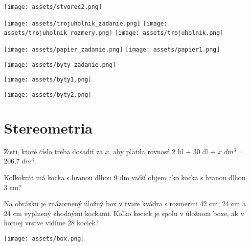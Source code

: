  \begin{example}
 	\begin{center}
 		\texttt{[image: assets/stvorec2.png]}
 	\end{center}
 \end{example}
 
 \begin{example}
 	\begin{center}
 		\texttt{[image: assets/trojuholnik\_zadanie.png]}
 		\texttt{[image: assets/trojuholnik\_rozmery.png]}
 		\texttt{[image: assets/trojuholnik.png]}
 	\end{center}
 \end{example}

\begin{example}
	\begin{center}
		\texttt{[image: assets/papier\_zadanie.png]}
		\texttt{[image: assets/papier1.png]}
	\end{center}
\end{example}

\begin{center}
	\texttt{[image: assets/byty\_zadanie.png]}
\end{center}

\begin{example}
	\begin{center}
		\texttt{[image: assets/byty1.png]}
	\end{center}
\end{example}

\begin{example}
	\begin{center}
		\texttt{[image: assets/byty2.png]}
	\end{center}
\end{example}
 

\section{Stereometria}

\begin{example}
	Zisti, ktoré číslo treba dosadiť za $x$, aby platila rovnosť 2 hl + 30 dl + $x$ $dm^3$ = 206,7 $dm^3$.
\end{example}

\begin{example}
	Koľkokrát má kocka s hranou dlhou 9 dm väčší objem ako kocka s hranou dlhou 3 cm?	
\end{example}

\begin{example}
	Na obrázku je znázornený úložný box v tvare kvádra s rozmermi 42 cm, 24 cm a 24 cm vyplnený zhodnými kockami. Koľko kociek je spolu v úložnom boxe, ak v hornej vrstve vidíme 28 kociek?
	
	\begin{center}
		\texttt{[image: assets/box.png]}
	\end{center}
	
\end{example}

